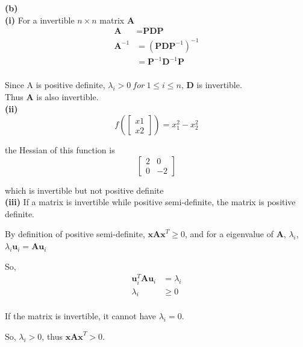 \documentclass[11pt]{article}
\begin{document}
\noindent\textbf{(b)}\\

\textbf{(i)}
For a invertible $n\times n$ matrix \textbf{A}\\
\begin{equation} \label{eq6}
\begin{split}
\textbf{A}&=\textbf{PDP}\\
\textbf{A}^{-1}&=(\textbf{PDP}^{-1})^{-1}\\
&=\textbf{P}^{-1}\textbf{D}^{-1}\textbf{P}\\
\end{split}
\end{equation}

Since A is positive definite, $\lambda_i > 0\ for\ 1\le i\le n$, $\textbf{D}$ is invertible.\\

Thus \textbf{A} is also invertible.\\

\textbf{(ii)}
$$f\left(\begin{bmatrix}
x1\\x2
\end{bmatrix}\right) = x_1^2-x_2^2$$

the Hessian of this function is\\

$$\begin{bmatrix}
2&0\\0&-2
\end{bmatrix}
$$

which is invertible but not positive definite\\

\pagebreak
\textbf{(iii)}
If a matrix is invertible while positive semi-definite, the matrix is positive definite.

By definition of positive semi-definite, $\textbf{xAx}^T\ge 0$, and for a eigenvalue of $\textbf{A}$, $\lambda_i$, $\lambda_i\textbf{u}_i=\textbf{Au}_i$ 

So, 
\begin{equation} \label{eq7}
\begin{split}
\textbf{u}_i^T\textbf{A}\textbf{u}_i&=\lambda_i\\
\lambda_i&\ge 0\\
\end{split}
\end{equation}

If the matrix is invertible, it cannot have $\lambda_i = 0$.

So, $\lambda_i>0$, thus $\textbf{xAx}^T>0$.
\end{document}

